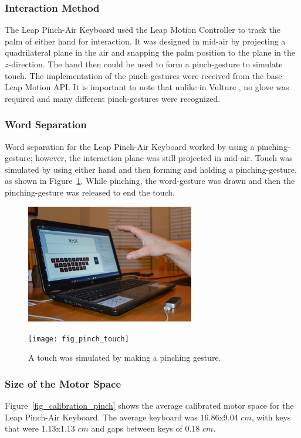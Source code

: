 \subsubsection{Interaction Method}
The Leap Pinch-Air Keyboard used the Leap Motion Controller to track the palm of either hand for interaction. It was designed in mid-air by projecting a quadrilateral plane in the air and snapping the palm position to the plane in the $z$-direction. The hand then could be used to form a pinch-gesture to simulate touch. The implementation of the pinch-gestures were received from the base Leap Motion API. It is important to note that unlike in Vulture \cite{ref_vulture}, no glove was required and many different pinch-gestures were recognized.

\subsubsection{Word Separation}
Word separation for the Leap Pinch-Air Keyboard worked by using a pinching-gesture; however, the interaction plane was still projected in mid-air. Touch was simulated by using either hand and then forming and holding a pinching-gesture, as shown in Figure~\ref{pinch_press_comparison}. While pinching, the word-gesture was drawn and then the pinching-gesture was released to end the touch.

\begin{figure}[h]
	\centering
	\begin{minipage}[t]{5.8in}
		\begin{minipage}[t]{2.85in}
			\includegraphics[width=2.9in]{fig_pinch_hover}
		\end{minipage}
		\begin{minipage}[t]{2.9in}
			\texttt{[image: fig\_pinch\_touch]}
		\end{minipage}
	\end{minipage}
	\caption[Leap Pinch-Air Word Separation]{A touch was simulated by making a pinching gesture.}
	\label{pinch_press_comparison}
\end{figure}

\subsubsection{Size of the Motor Space}
Figure~\ref{fig_calibration_pinch} shows the average calibrated motor space for the Leap Pinch-Air Keyboard. The average keyboard was 16.86x9.04 $cm$, with keys that were 1.13x1.13 $cm$ and gaps between keys of 0.18 $cm$.